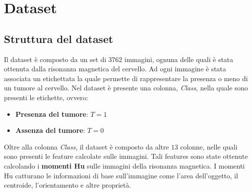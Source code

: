 \chapter{Dataset}
\section{Struttura del dataset}
Il dataset è composto da un set di $3762$ immagini, ognuna delle quali è stata
ottenuta dalla risonanza magnetica del cervello. Ad ogni immagine è stata
associata un etichettata la quale permette di rappresentare la presenza o meno
di un tumore al cervello. Nel dataset è presente una colonna, \textit{Class},
nella quale sono presenti le etichette, ovvero:
\begin{itemize}
    \item \textbf{Presenza del tumore}: $T = 1$
    \item \textbf{Assenza del tumore}: $T = 0$
\end{itemize}

Oltre alla colonna \textit{Class}, il dataset è composto da altre $13$ colonne,
nelle quali sono presenti le feature calcolate sulle immagini. Tali features sono state
ottenute calcolando i \textbf{momenti Hu} sulle immagini della risonanza magnetica.
I momenti Hu catturano le informazioni di base sull'immagine come l'area
dell'oggetto, il centroide, l'orientamento e altre proprietà.

